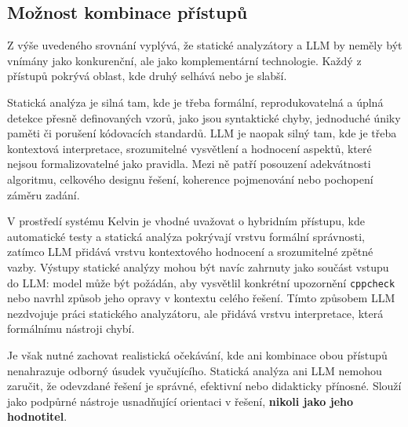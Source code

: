 \subsection{Možnost kombinace přístupů}
\label{subsec:static-llm-combination}

Z výše uvedeného srovnání vyplývá, že statické analyzátory a LLM by neměly být vnímány jako konkurenční, ale jako komplementární technologie.
Každý z přístupů pokrývá oblast, kde druhý selhává nebo je slabší.

Statická analýza je silná tam, kde je třeba formální, reprodukovatelná a úplná detekce přesně definovaných vzorů, jako jsou syntaktické chyby, jednoduché úniky paměti či porušení kódovacích standardů.
LLM je naopak silný tam, kde je třeba kontextová interpretace, srozumitelné vysvětlení a hodnocení aspektů, které nejsou formalizovatelné jako pravidla.
Mezi ně patří posouzení adekvátnosti algoritmu, celkového designu řešení, koherence pojmenování nebo pochopení záměru zadání.

V prostředí systému Kelvin je vhodné uvažovat o hybridním přístupu, kde automatické testy a statická analýza pokrývají vrstvu formální správnosti, zatímco LLM přidává vrstvu kontextového hodnocení a srozumitelné zpětné vazby.
Výstupy statické analýzy mohou být navíc zahrnuty jako součást vstupu do LLM: model může být požádán, aby vysvětlil konkrétní upozornění \texttt{cppcheck} nebo navrhl způsob jeho opravy v kontextu celého řešení.
Tímto způsobem LLM nezdvojuje práci statického analyzátoru, ale přidává vrstvu interpretace, která formálnímu nástroji chybí.

Je však nutné zachovat realistická očekávání, kde ani kombinace obou přístupů nenahrazuje odborný úsudek vyučujícího.
Statická analýza ani LLM nemohou zaručit, že odevzdané řešení je správné, efektivní nebo didakticky přínosné.
Slouží jako podpůrné nástroje usnadňující orientaci v řešení, \textbf{nikoli jako jeho hodnotitel}.

\endinput